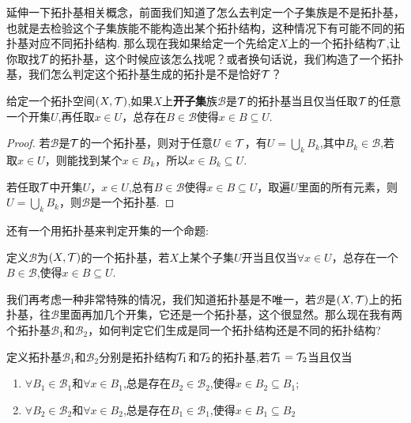 延伸一下拓扑基相关概念，前面我们知道了怎么去判定一个子集族是不是拓扑基，也就是去检验这个子集族能不能构造出某个拓扑结构，这种情况下有可能不同的拓扑基对应不同拓扑结构. 那么现在我如果给定一个先给定$X$上的一个拓扑结构$\mathcal{T}$,让你取找$\mathcal{T}$的拓扑基，这个时候应该怎么找呢？或者换句话说，我们构造了一个拓扑基，我们怎么判定这个拓扑基生成的拓扑是不是恰好$\mathcal{T}$？

\begin{proposition}
给定一个拓扑空间$(X,\mathcal{T})$,如果$X$上\textbf{开子集}族$\mathscr{B}$是$\mathcal{T}$的拓扑基当且仅当任取$\mathcal{T}$的任意一个开集$U$,再任取$x \in U$，总存在$B \in \mathscr{B}$使得$x \in B \subseteq U$.
\end{proposition}

\begin{proof}
若$\mathscr{B}$是$\mathcal{T}$的一个拓扑基，则对于任意$U \in \mathcal{T}$，有$U = \bigcup\limits_k B_k$,其中$B_k \in \mathscr{B}$,若取$x \in U$，则能找到某个$x \in B_k$，所以$x \in B_k \subseteq U$.

若任取$\mathcal{T}$中开集$U$，$x \in U$,总有$B \in \mathscr{B}$使得$x \in B \subseteq U$，取遍$U$里面的所有元素，则$U = \bigcup\limits_k B_k$，则$\mathscr{B}$是一个拓扑基.
\end{proof}

还有一个用拓扑基来判定开集的一个命题:

\begin{proposition}
定义$\mathscr{B}$为$(X,\mathcal{T})$的一个拓扑基，若$X$上某个子集$U$开当且仅当$\forall x \in U$，总存在一个$B \in \mathscr{B}$,使得$x \in B \subseteq U$.
\end{proposition}

我们再考虑一种非常特殊的情况，我们知道拓扑基是不唯一，若$\mathscr{B}$是$(X,\mathcal{T})$上的拓扑基，往$\mathscr{B}$里面再加几个开集，它还是一个拓扑基，这个很显然。那么现在我有两个拓扑基$\mathscr{B}_1$和$\mathscr{B}_2$，如何判定它们生成是同一个拓扑结构还是不同的拓扑结构?

\begin{proposition}
定义拓扑基$\mathscr{B}_1$和$\mathscr{B}_2$分别是拓扑结构$\mathcal{T}_1$和$\mathcal{T}_2$的拓扑基,若$\mathcal{T}_1 = \mathcal{T}_2$当且仅当
\begin{enumerate}
	\item $\forall B_1 \in \mathscr{B}_1$和$\forall x \in B_1$,总是存在$B_2 \in \mathscr{B}_2$,使得$x \in B_2 \subseteq B_1$;
	\item $\forall B_2 \in \mathscr{B}_2$和$\forall x \in B_2$,总是存在$B_1 \in \mathscr{B}_1$,使得$x \in B_1 \subseteq B_2$
\end{enumerate}
\end{proposition}


